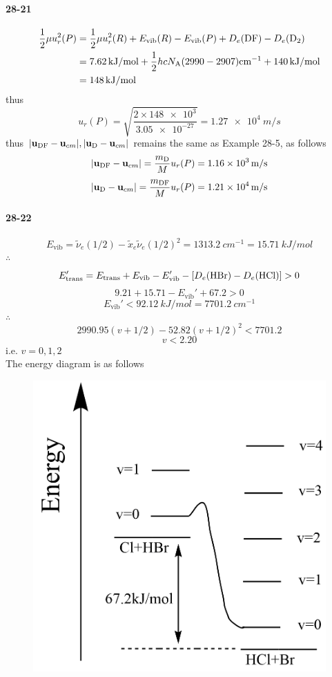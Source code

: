 \documentclass[a4paper]{article}
\newcommand{\NA}{N_\mathrm{A}}
\newcommand{\ex}[1]{\paragraph{28-#1}}
\numberwithin{equation}{section}
\begin{document}
\ex{21}
\begin{align}
\dfrac{1}{2}\mu u_r^2(P) &= \dfrac{1}{2}\mu u_r^2(R) + E_{\text{vib}}(R) - E_{\text{vib}}(P) + D_e(\ce{DF}) - D_e(\ce{D_2}) \notag\\
&= \SI{7.62}{kJ/mol} + \dfrac{1}{2}hc\NA(2990-2907)\si{cm^{-1}} + \SI{140}{kJ/mol} \notag\\
&= \SI{148}{kJ/mol}
\end{align}
thus
\begin{equation}\label{key}
u_r(P) = \sqrt{\dfrac{2\times \num{148e3}}{\num{3.05e-27}}} = \SI{1.27e4}{m/s}
\end{equation}
thus $ \abs{\vb{u}_{\ce{DF}} - \vb{u}_{cm}}, \abs{\vb{u}_{\ce{D}} - \vb{u}_{cm}}  $ remains the same as Example 28-5, as follows
\begin{equation}\label{key}
\abs{\vb{u}_{\ce{DF}} - \vb{u}_{cm}} = \dfrac{m_{\ce{D}}}{M}u_r(P) = \SI{1.16e3}{m/s}
\end{equation}
\begin{equation}\label{key}
\abs{\vb{u}_{\ce{D}} - \vb{u}_{cm}} = \dfrac{m_{\ce{DF}}}{M}u_r(P) = \SI{1.21e4}{m/s}
\end{equation}


\ex{22}
\begin{equation}\label{key}
E_{\text{vib}} = \tilde{\nu}_e(1/2) - \tilde{x}_e\tilde{\nu}_e(1/2)^2 = \SI{1313.2}{cm^{-1}} = \SI{15.71}{kJ/mol}
\end{equation}
$ \therefore $
\begin{equation}\label{key}
E_{\text{trans}}' = E_{\text{trans}} + E_{\text{vib}} - E_{\text{vib}}' - [ D_e(\ce{HBr}) - D_e(\ce{HCl})] > 0
\end{equation}
\begin{equation}\label{key}
9.21 + 15.71 - E_{\text{vib}}' + 67.2 > 0
\end{equation}
\begin{equation}\label{key}
E_{\text{vib}}' < \SI{92.12}{kJ/mol} = \SI{7701.2}{cm^{-1}}
\end{equation}
$ \therefore $
\begin{equation}\label{key}
2990.95 (v + 1/2) - 52.82 (v+1/2)^2 < 7701.2
\end{equation}
\begin{equation}\label{key}
v < 2.20 
\end{equation}
i.e. $ v=0,1,2 $\\
The energy diagram is as follows
\begin{figure}[H]
	\centering
	\includegraphics[width=0.5\linewidth]{28-22.png}
\end{figure}
\end{document}
